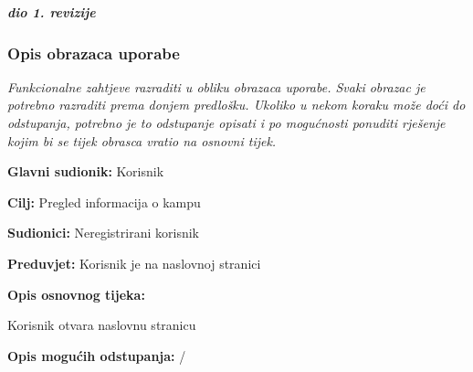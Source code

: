 				\textbf{\textit{dio 1. revizije}}
				
				\subsubsection{Opis obrazaca uporabe}
					\textit{Funkcionalne zahtjeve razraditi u obliku obrazaca uporabe. Svaki obrazac je potrebno razraditi prema donjem predlošku. Ukoliko u nekom koraku može doći do odstupanja, potrebno je to odstupanje opisati i po mogućnosti ponuditi rješenje kojim bi se tijek obrasca vratio na osnovni tijek.}\\
					
					
					\noindent {}
					\begin{packed_item}
						
						\item \textbf{Glavni sudionik: } Korisnik
						\item  \textbf{Cilj:} Pregled informacija o kampu
						\item  \textbf{Sudionici:} Neregistrirani korisnik
						\item  \textbf{Preduvjet:} Korisnik je na naslovnoj stranici
						\item  \textbf{Opis osnovnog tijeka:}
						
						\item[] \begin{packed_enum}
							
							\item Korisnik otvara naslovnu stranicu
							
						\end{packed_enum}
						
						\item  \textbf{Opis mogućih odstupanja:} /
						
					\end{packed_item}
					
